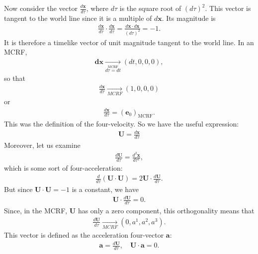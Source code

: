 \documentclass[11pt,letterpaper]{book}
\begin{document}
        Now consider the vector \( \frac{d\mathbf{x}}{d\tau} \), where \( d\tau \) is the square root of \((d\tau)^2\). This vector is tangent to the world line since it is a multiple of \( d\mathbf{x} \). Its magnitude is
        \begin{align}
        \frac{d\mathbf{x}}{d\tau} \cdot \frac{d\mathbf{x}}{d\tau} = \frac{d\mathbf{x} \cdot d\mathbf{x}}{(d\tau)^2} = -1.
        \end{align}
        It is therefore a timelike vector of unit magnitude tangent to the world line. In an MCRF,
        \begin{align}
        \mathbf{dx} \underset{\stackrel{\text{MCRF}}{\text{\(d\tau = dt\)}}}{\longrightarrow}(dt, 0, 0, 0),
        \end{align}
        so that
        \begin{align}
        \frac{d\mathbf{x}}{d\tau} \underset{MCRF}{\longrightarrow} (1, 0, 0, 0)
        \end{align}
        or
        \begin{align}
        \frac{d\mathbf{x}}{d\tau} = (\mathbf{e}_0)_{\text{MCRF}}.
        \end{align}
        This was the definition of the four-velocity. So we have the useful expression:
        \begin{align}
        \mathbf{U} = \frac{d\mathbf{x}}{d\tau}
        \end{align}
        Moreover, let us examine
        \begin{align}
        \frac{d\mathbf{U}}{d\tau} = \frac{d^2\mathbf{x}}{d\tau^2},
        \end{align}
        which is some sort of four-acceleration:
        \begin{align}
        \frac{d}{d\tau} (\mathbf{U} \cdot \mathbf{U}) = 2\mathbf{U} \cdot \frac{d\mathbf{U}}{d\tau}.
        \end{align}
        But since \( \mathbf{U} \cdot \mathbf{U} = -1 \) is a constant, we have
        \begin{align}
        \mathbf{U} \cdot \frac{d\mathbf{U}}{d\tau} = 0.
        \end{align}
        Since, in the MCRF, \( \mathbf{U} \) has only a zero component, this orthogonality means that
        \begin{align}
        \frac{d\mathbf{U}}{d\tau} \underset{MCRF}{\longrightarrow} (0, a^1, a^2, a^3).
        \end{align}
        This vector is defined as the acceleration four-vector \( \mathbf{a} \):
        \begin{align}
        \mathbf{a} = \frac{d\mathbf{U}}{d\tau}, \quad \mathbf{U} \cdot \mathbf{a} = 0.
        \end{align}
\end{document}
